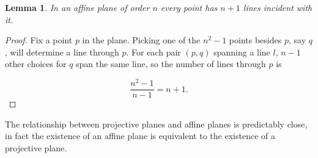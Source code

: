 \documentclass{article}
\newtheorem{lemma}{Lemma}
\begin{document}
\begin{lemma}
  In an affine plane of order \(n\) every point has \(n + 1\) lines incident with it.
\end{lemma}
\begin{proof}
  Fix a point \(p\) in the plane. Picking one of the \(n^{2} - 1\) points besides \(p\), say \(q\), will determine a line through \(p\). For each pair \((p, q)\) spanning a line \(l\), \(n - 1\) other choices for \(q\) span the same line, so the number of lines through \(p\) is

  \begin{equation}
    \frac{n^{2} - 1}{n - 1} = n + 1.
  \end{equation}
\end{proof}

The relationship between projective planes and affine planes is predictably close, in fact the existence of an affine plane is equivalent to the existence of a projective plane.
\end{document}
